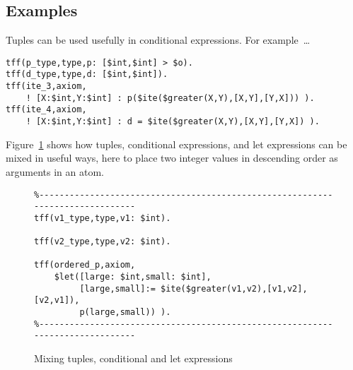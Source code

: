 \documentclass{easychair}
\begin{document}
\subsection{Examples}
\label{Examples}

Tuples can be used usefully in conditional expressions. For example~\ldots
\begin{verbatim}
tff(p_type,type,p: [$int,$int] > $o).
tff(d_type,type,d: [$int,$int]).
tff(ite_3,axiom,
    ! [X:$int,Y:$int] : p($ite($greater(X,Y),[X,Y],[Y,X])) ).
tff(ite_4,axiom,
    ! [X:$int,Y:$int] : d = $ite($greater(X,Y),[X,Y],[Y,X]) ).
\end{verbatim}






Figure~\ref{TupleConditionalLet} shows how tuples, conditional expressions, 
and let expressions can be mixed in useful ways, here to place two integer
values in descending order as arguments in an atom.

\begin{figure}[htbp]
\begin{small}
\begin{verbatim}
%------------------------------------------------------------------------------
tff(v1_type,type,v1: $int).

tff(v2_type,type,v2: $int).

tff(ordered_p,axiom,
    $let([large: $int,small: $int],
         [large,small]:= $ite($greater(v1,v2),[v1,v2],[v2,v1]),
         p(large,small)) ).
%------------------------------------------------------------------------------
\end{verbatim}
\end{small}
\caption{Mixing tuples, conditional and let expressions}
\label{TupleConditionalLet}
\end{figure}
\end{document}
